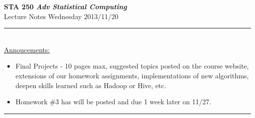 \documentclass[a4paper, 11pt]{report}
\begin{document}
\begin{center}
	\LARGE 
	\textbf{STA 250 \textit{Adv Statistical Computing}}\\
	\Large
	Lecture Notes Wednesday 2013/11/20\\
	\normalsize
\end{center}
\noindent\rule{\textwidth}{1pt} \\


 
\noindent 
\underline{Annoucements:} 
\begin{itemize}
	\item Final Projects - 10 pages max, suggested topics posted on the course website, extensions of our homework assignments, implementations of new algorithms, deepen skills learned such as Hadoop or Hive, etc.
	
	\item Homework \#3 has will be posted and due 1 week later on 11/27.	

\end{itemize}
\noindent\rule{\textwidth}{1pt} \\
\end{document}
